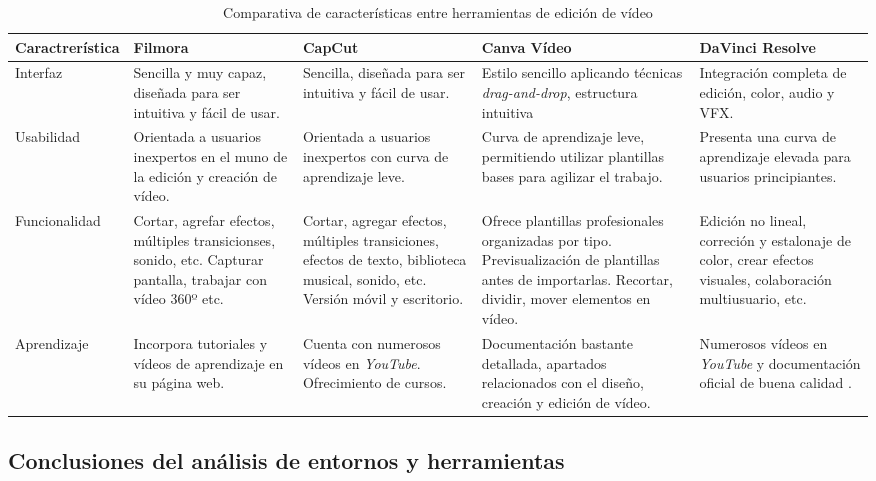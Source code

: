 \begin{table}[H]
\centering
\footnotesize
\begin{tabularx}{\textwidth}{|p{3cm}|Y|Y|Y|Y|}
\hline
\textbf{Caractrerística} & \textbf{Filmora} & \textbf{CapCut} & \textbf{Canva Vídeo} & \textbf{DaVinci Resolve} \\ \hline

Interfaz &
Sencilla y muy capaz, diseñada para ser intuitiva y fácil de usar. &
Sencilla, diseñada para ser intuitiva y fácil de usar. &
Estilo sencillo aplicando técnicas \textit{drag-and-drop}, estructura intuitiva &
Integración completa de edición, color, audio y VFX. \\ \hline

Usabilidad &
Orientada a usuarios inexpertos en el muno de la edición y creación de vídeo. &
Orientada a usuarios inexpertos con curva de aprendizaje leve. &
Curva de aprendizaje leve, permitiendo utilizar plantillas bases para agilizar el trabajo. &
Presenta una curva de aprendizaje elevada para usuarios principiantes. \\ \hline 

Funcionalidad &
Cortar, agrefar efectos, múltiples transicionses, sonido, etc. Capturar pantalla, trabajar con vídeo 360º etc. &
Cortar, agregar efectos, múltiples transiciones, efectos de texto, biblioteca musical, sonido, etc. Versión móvil y escritorio. &
Ofrece plantillas profesionales organizadas por tipo. Previsualización de plantillas antes de importarlas. Recortar, dividir, mover elementos en vídeo. &
Edición no lineal, correción y estalonaje de color, crear efectos visuales, colaboración multiusuario, etc. \\ \hline

Aprendizaje &
Incorpora tutoriales y vídeos de aprendizaje en su página web. &
Cuenta con numerosos vídeos en \textit{YouTube}. Ofrecimiento de cursos. &
Documentación bastante detallada, apartados relacionados con el diseño, creación y edición de vídeo. &
Numerosos vídeos en \textit{YouTube} y documentación oficial de buena calidad . \\ \hline

\end{tabularx}
\caption{Comparativa de características entre herramientas de edición de vídeo}
\label{tab:caracteristicas}
\end{table}

\subsection{Conclusiones del análisis de entornos y herramientas}

